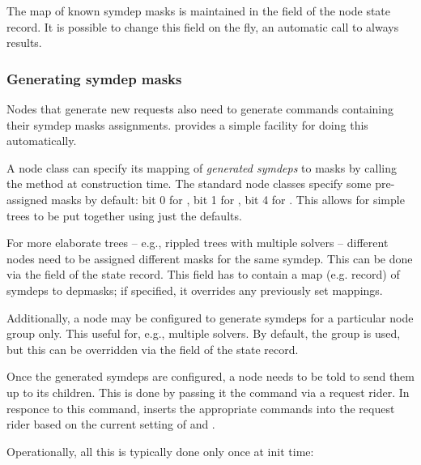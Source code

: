 \documentclass[10pt]{article}
\begin{document}
  The map of known symdep masks is maintained in the  field of
  the node state record. It is possible to change this field on the fly, an
  automatic call to  always results.

\subsubsection{Generating symdep masks}

  Nodes that generate new requests also need to generate 
  commands containing their symdep masks assignments.  provides a
  simple facility for doing this automatically.
  
  A node class can specify its mapping of {\em generated symdeps} to masks
  by calling the  method at construction time. The standard
  node classes specify some pre-assigned masks by default: bit 0 for
  , bit 1 for , bit 4 for . This
  allows for simple trees to be put together using just the defaults.
  
  For more elaborate trees -- e.g., rippled trees with multiple solvers --
  different  nodes need to be assigned different masks for the same
  symdep. This can be done via the  field of the state record.
  This field has to contain a map (e.g. record) of symdeps to depmasks; if
  specified, it overrides any previously set mappings. 
  
  Additionally, a node may be configured to generate symdeps for a particular
  node group only. This useful for, e.g., multiple solvers. By default, the
   group is used, but this can be overridden via the
   field of the state record.

  Once the generated symdeps are configured, a node needs to be told to send
  them up to its children. This is done by passing it the 
  command via a request rider. In responce to this command,
   inserts the appropriate  commands
  into the request rider based on the current setting of  and
  .
  
  Operationally, all this is typically done only once at init time:
  
\end{document}
